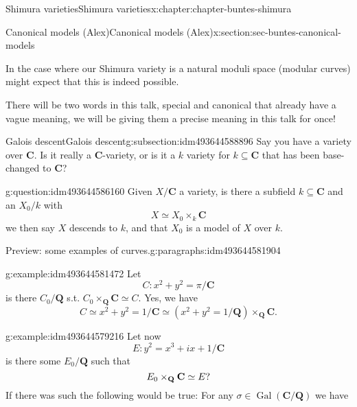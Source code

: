\documentclass[oneside,10pt,]{book}
\numberwithin{equation}{section}
\newcommand{\QQ}{\mathbf{Q}}
\newcommand{\CC}{\mathbf{C}}
\newcommand{\Gal}[2]{\operatorname{Gal}(#1/#2)}
\begin{document}
\begin{chapterptx}{Shimura varieties}{}{Shimura varieties}{}{}{x:chapter:chapter-buntes-shimura}
\begin{sectionptx}{Canonical models (Alex)}{}{Canonical models (Alex)}{}{}{x:section:sec-buntes-canonical-models}
\begin{introduction}{}
\par
In the case where our Shimura variety is a natural moduli space (modular curves) might expect that this is indeed possible.%
\par
There will be two words in this talk, special and canonical that already have a vague meaning, we will be giving them a precise meaning in this talk for once!%
\end{introduction}%
%
%
\typeout{************************************************}
\typeout{************************************************}
%
\begin{subsectionptx}{Galois descent}{}{Galois descent}{}{}{g:subsection:idm493644588896}
Say you have a variety over \(\CC\). Is it really a \(\CC\)-variety, or is it a \(k\) variety for \(k \subseteq \CC\) that has been base-changed to \(\CC\)?%
\begin{question}{}{g:question:idm493644586160}%
Given \(X/\CC\) a variety, is there a subfield \(k \subseteq \CC\) and an \(X_0/k\) with%
\begin{equation*}
X \simeq X_0 \times_k \CC
\end{equation*}
we then say \(X\) descends to \(k\), and that \(X_0\) is a model of \(X\) over \(k\).%
\end{question}
\begin{paragraphs}{Preview: some examples of curves.}{g:paragraphs:idm493644581904}%
\begin{example}{}{g:example:idm493644581472}%
Let%
\begin{equation*}
C \colon x^2+ y^2 = \pi/\CC
\end{equation*}
is there \(C_0/\QQ\) s.t. \(C_0\times_\QQ \CC \simeq C\). Yes, we have%
\begin{equation*}
C \simeq x^2 + y^2 = 1/\CC \simeq (x^2 + y^2 = 1/\QQ )\times_{\QQ} \CC\text{.}
\end{equation*}
%
\end{example}
\begin{example}{}{g:example:idm493644579216}%
Let now%
\begin{equation*}
E \colon y^2 = x^3 + ix + 1/\CC
\end{equation*}
is there some \(E_0/\QQ\) such that%
\begin{equation*}
E_0\times_{\QQ} \CC  \simeq E\text ?
\end{equation*}
If there was such the following would be true: For any \(\sigma\in \Gal{\CC}{\QQ}\) we have%
\begin{equation*}

\end{equation*}
\end{example}
\end{paragraphs}
\end{subsectionptx}
\end{sectionptx}
\end{chapterptx}
\end{document}
